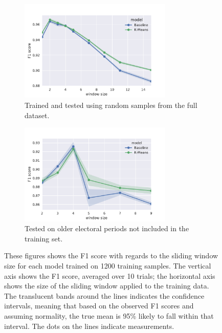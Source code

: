 \begin{figure}[p]
  \centering
  \begin{subfigure}[b]{\textwidth}
    \centering
    \includegraphics[width=0.8\textwidth]{figures/results/800-windowsize/tseries_f1.pdf}
    \caption{Trained and tested using random samples from the full dataset.\label{fig:window_new}}
  \end{subfigure}
  \begin{subfigure}[b]{\textwidth}
    \centering
    \includegraphics[width=0.8\textwidth]{figures/results/800-windowsize_oldtest/tseries_f1.pdf}
    \caption{Tested on older electoral periods not included in the training
    set.\label{fig:window_old}}
  \end{subfigure}
  \caption{These figures shows the F1 score with regards to the sliding window
    size for each model trained on 1200 training samples.  The vertical axis
    shows the F1 score, averaged over 10 trials; the horizontal axis shows the
    size of the sliding window applied to the training data. The translucent
    bands around the lines indicates the confidence intervals, meaning that
    based on the observed F1 scores and assuming normality, the true mean is
    95\% likely to fall within that interval. The dots on the lines indicate
    measurements.\label{fig:window}}
\end{figure}

